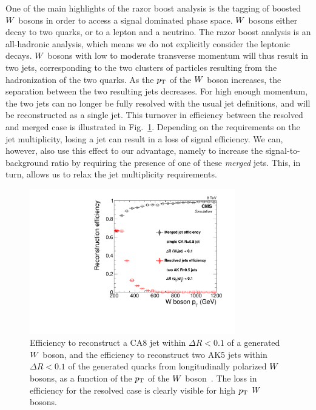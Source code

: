 
One of the main highlights of the razor boost analysis is the tagging of boosted $W$ bosons in
order to access a signal dominated phase space. 
$W$ bosons either decay to two quarks, or to a lepton and a neutrino. The razor boost analysis is
an all-hadronic analysis, which means we do not explicitly consider the leptonic decays. 
$W$ bosons with low to moderate transverse momentum will thus result in two jets, corresponding to
the two clusters of particles resulting from the hadronization of the two quarks. 
As the $p_{\mathrm{T}}$ of the $W$ boson increases, the separation between the two resulting jets decreases.
For high enough momentum, the two jets can no longer be fully resolved with the usual jet
definitions, and will be reconstructed as a single jet. This turnover in efficiency between the
resolved and merged case is illustrated in Fig.~\ref{fig:boost_wtag_ca8eff}.
Depending on the requirements on the jet multiplicity, losing a jet can result in a loss of signal
efficiency. We can, however, also use this effect to our advantage, namely to increase the
signal-to-background ratio by requiring the presence of one of these \textit{merged} jets. 
This, in turn, allows us to relax the jet multiplicity requirements. 

\begin{figure}
  \centering
  \includegraphics[width=0.8\textwidth]{figures/razor_wtag/ca8effVsPt}
  \caption{Efficiency to reconstruct a CA8 jet within $\Delta R<0.1$ of a generated $W$ boson, and
the efficiency to reconstruct two AK5 jets within $\Delta R<0.1$ of the generated quarks from
longitudinally polarized $W$ bosons, as a function of the $p_{\mathrm{T}}$ of the $W$
boson~\cite{Khachatryan:2014vla}. The loss in efficiency for the resolved case is clearly visible
for high $p_{\mathrm{T}}$ $W$ bosons. 
  \label{fig:boost_wtag_ca8eff}}
\end{figure}

